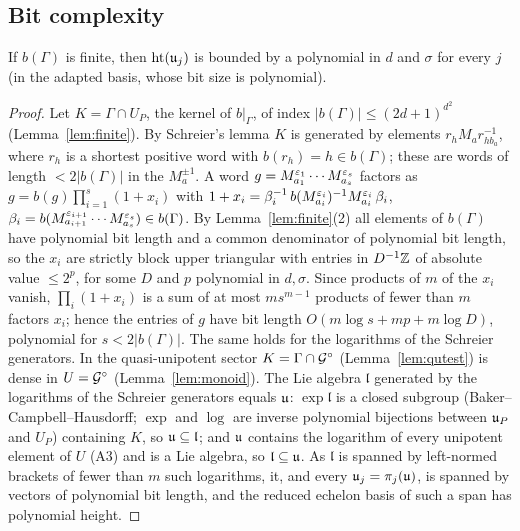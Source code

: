 \subsection{Bit complexity}\label{ssec:bits}
\begin{lemma}\label{lem:apriori}
If $b(\Gamma)$ is finite, then $\operatorname{ht}(\mathfrak{u}_j)$ is bounded by a polynomial in $d$ and $\sigma$ for every
$j$ (in the adapted basis, whose bit size is polynomial).
\end{lemma}
\begin{proof}
Let $K=\Gamma\cap U_P$, the kernel of $b|_\Gamma$, of index $|b(\Gamma)|\le(2d+1)^{d^2}$
(Lemma~\ref{lem:finite}). By Schreier's lemma $K$ is generated by elements $r_hM_ar_{hb_a}^{-1}$, where
$r_h$ is a shortest positive word with $b(r_h)=h\in b(\Gamma)$; these are words of length
$<2|b(\Gamma)|$ in the $M_a^{\pm1}$. A word $g=M_{a_1}^{\varepsilon_1}\cdots M_{a_s}^{\varepsilon_s}$ factors as
$g=b(g)\prod_{i=1}^s(1+x_i)$ with $1+x_i=\beta_i^{-1}\,b(M_{a_i}^{\varepsilon_i})^{-1}M_{a_i}^{\varepsilon_i}\,\beta_i$,
$\beta_i=b(M_{a_{i+1}}^{\varepsilon_{i+1}}\cdots M_{a_s}^{\varepsilon_s})\in b(\Gamma)$. By
Lemma~\ref{lem:finite}(2) all elements of $b(\Gamma)$ have polynomial bit length and a common
denominator of polynomial bit length, so the $x_i$ are strictly block upper triangular with entries
in $D^{-1}\mathbb{Z}$ of absolute value $\le2^{p}$, for some $D$ and $p$ polynomial in $d,\sigma$. Since
products of $m$ of the $x_i$ vanish, $\prod_i(1+x_i)$ is a sum of at most $ms^{m-1}$ products of fewer
than $m$ factors $x_i$; hence the entries of $g$ have bit length $O(m\log s+mp+m\log D)$, polynomial
for $s<2|b(\Gamma)|$. The same holds for the logarithms of the Schreier generators. In the quasi-unipotent
sector $K=\Gamma\cap\mathcal{G}^\circ$ (Lemma~\ref{lem:qutest}) is dense in $U=\mathcal{G}^\circ$ (Lemma~\ref{lem:monoid}).
The Lie algebra $\mathfrak l$ generated by the logarithms of the Schreier generators equals $\mathfrak{u}$:
$\exp\mathfrak l$ is a closed subgroup (Baker--Campbell--Hausdorff; $\exp$ and $\log$ are inverse
polynomial bijections between $\mathfrak{u}_P$ and $U_P$) containing $K$, so $\mathfrak{u}\subseteq\mathfrak l$; and
$\mathfrak{u}$ contains the logarithm of every unipotent element of $U$ (A3) and is a Lie algebra, so
$\mathfrak l\subseteq\mathfrak{u}$. As $\mathfrak l$ is spanned by left-normed brackets of fewer than $m$ such
logarithms, it, and every $\mathfrak{u}_j=\pi_j(\mathfrak{u})$, is spanned by vectors of polynomial bit length, and
the reduced echelon basis of such a span has polynomial height.
\end{proof}

